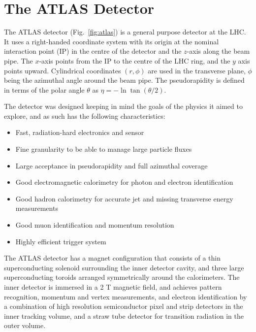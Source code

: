 % 


\section{The ATLAS Detector}

The ATLAS detector (Fig.~\ref{fig:atlas}) is a general purpose detector at the LHC. It uses a right-handed coordinate system with its origin at the nominal interaction point (IP) in the centre of the detector and the $z$-axis along the beam pipe. The $x$-axis points from the IP to the centre of the LHC ring, and the $y$ axis points upward. Cylindrical coordinates $(r,\phi)$ are used in the transverse plane, $\phi$ being the azimuthal angle around the beam pipe. The pseudorapidity is defined in terms of the polar angle $\theta$ as $\eta=-\ln\tan(\theta/2)$.

The detector was designed keeping in mind the goals of the physics it aimed to explore, and as such has the following characteristics:
\begin{itemize}
\item Fast, radiation-hard electronics and sensor
\item Fine granularity to be able to manage large particle fluxes
\item Large acceptance in pseudorapidity and full azimuthal coverage
\item Good electromagnetic calorimetry for photon and electron identification
\item Good hadron calorimetry for accurate jet and missing transverse energy measurements
\item Good muon identification and momentum resolution
\item Highly efficient trigger system 
\end{itemize}

The ATLAS detector has a magnet configuration that consists of a thin superconducting solenoid surrounding the inner detector cavity, and three large superconducting toroids arranged symmetrically around the calorimeters. The inner detector is immersed in a 2 T magnetic field, and achieves pattern recognition, momentum and vertex measurements, and electron identification by a combination of high resolution semiconductor pixel and strip detectors in the inner tracking volume, and a straw tube detector for transition radiation in the outer volume. 

